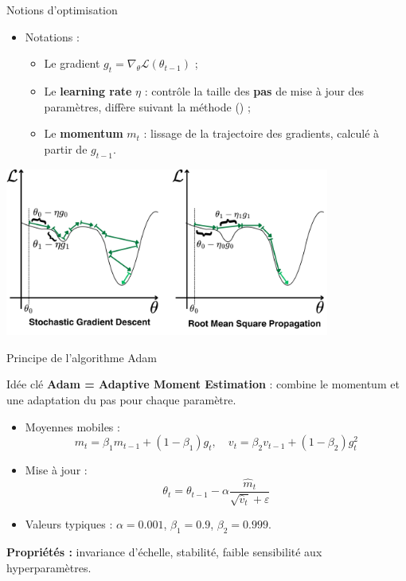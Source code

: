 \documentclass{beamer}
\begin{document}
\begin{frame}{Notions d'optimisation}

  \begin{itemize}
    \item Notations :
    \begin{itemize}
      \item Le gradient $g_t = \nabla_{\theta} \mathcal{L}(\theta_{t-1})$ ;
      \item Le \textbf{learning rate} $\eta$ : contrôle la taille des \textbf{pas} de mise à jour des paramètres, diffère suivant la méthode (\cite{ruder2016overview}) ;
      \item Le \textbf{momentum} $m_t$ : lissage de la trajectoire des gradients, calculé à partir de $g_{t-1}$.
    \end{itemize}
  \end{itemize}

  \begin{center}
    \includegraphics[width=0.8\textwidth]{SGD_RMSProp.png}
  \end{center}

\end{frame}


\begin{frame}{Principe de l’algorithme Adam}

\begin{block}{Idée clé}
\textbf{Adam = Adaptive Moment Estimation} :
combine le \textcolor{mygreen}{momentum} et une adaptation du pas pour chaque paramètre.
\end{block}

\bigskip

\begin{itemize}
  \item Moyennes mobiles :
    \[
      m_t = \beta_1 m_{t-1} + (1 - \beta_1) g_t, \quad
      v_t = \beta_2 v_{t-1} + (1 - \beta_2) g_t^2
    \]
  \item Mise à jour :
    \[
      \theta_t = \theta_{t-1} - \alpha \frac{\hat{m}_t}{\sqrt{\hat{v}_t} + \varepsilon}
    \]
  \item Valeurs typiques : $\alpha{=}0.001$, $\beta_1{=}0.9$, $\beta_2{=}0.999$.
\end{itemize}

\bigskip

\textbf{Propriétés :}
invariance d’échelle, stabilité, faible sensibilité aux hyperparamètres.

\end{frame}
\end{document}
